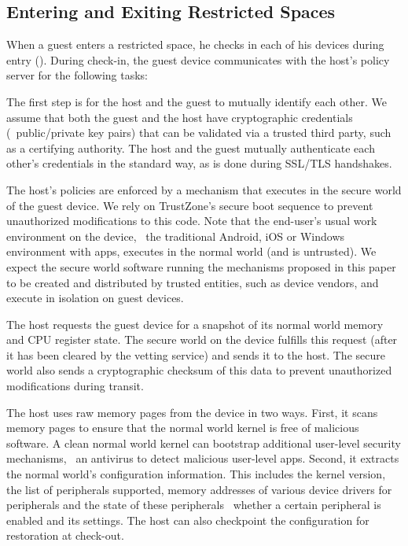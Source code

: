 \subsection{Entering and Exiting Restricted Spaces}
\label{section:usagemodel:checkin}

 When a guest enters a restricted space, he checks in
each of his devices during entry ().  During
check-in, the guest device communicates with the host's policy server for the
following tasks:

\begin{mylist}
%
\item {} The first step is for the host and the guest to
mutually identify each other. We assume that both the guest and the host have
cryptographic credentials (\eg~public/private key pairs) that can be validated
via a trusted third party, such as a certifying authority. The host and the
guest mutually authenticate each other's credentials in the standard way, as is
done during SSL/TLS handshakes.

The host's policies are enforced by a mechanism that executes in the secure
world of the guest device. We rely on TrustZone's secure boot sequence to
prevent unauthorized modifications to this code. Note that the end-user's usual
work environment on the device, \eg~the traditional Android, iOS or Windows
environment with apps, executes in the normal world (and is untrusted). We
expect the secure world software running the mechanisms proposed in this paper
to be created and distributed by trusted entities, such as device vendors, and
execute in isolation on guest devices.

\item {} The host requests the guest
device for a snapshot of its normal world memory and CPU register state. The
secure world on the device fulfills this request (after it has been cleared by
the vetting service) and sends it to the host. The secure world also sends a
cryptographic checksum of this data to prevent unauthorized modifications
during transit.

The host uses raw memory pages from the device in two ways. First, it scans
memory pages to ensure that the normal world kernel is free of malicious
software. A clean normal world kernel can bootstrap additional user-level
security mechanisms, \eg~an antivirus to detect malicious user-level apps.
Second, it extracts the normal world's configuration information. This includes
the kernel version, the list of peripherals supported, memory addresses of
various device drivers for peripherals and the state of these peripherals
\eg~whether a certain peripheral is enabled and its settings. The host can also
checkpoint the configuration for restoration at check-out. 


\end{mylist}
